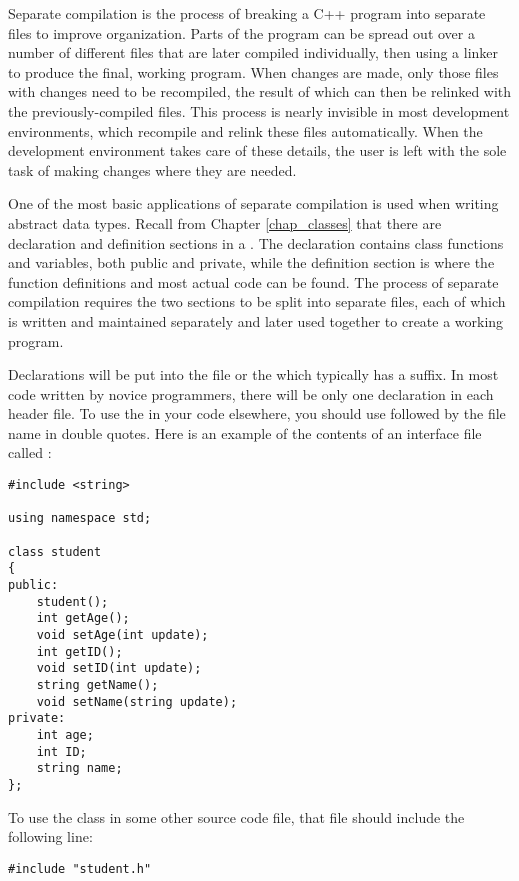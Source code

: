 Separate compilation is the process of breaking a C++ program into separate files to improve organization. 
Parts of the program can be spread out over a number of different files that are later compiled individually, then  using a linker to produce the final, working program. 
When changes are made, only those files with changes need to be recompiled, the result of which can then be relinked with the previously-compiled files. 
This process is nearly invisible in most development environments, which recompile and relink these files automatically.
When the development environment takes care of these details, the user is left with the sole task of making changes where they are needed. 

One of the most basic applications of separate compilation is used when writing abstract data types. 
Recall from Chapter \ref{chap_classes} that there are declaration and definition sections in a . 
The declaration contains class functions and variables, both public and private, while the definition section is where the function definitions and most actual code can be found. 
The process of separate compilation requires the two sections to be split into separate files, each of which is written and maintained separately and later used together to create a working program. 

Declarations will be put into the  file or the  which typically has a  suffix.
In most code written by novice programmers, there will be only one  declaration in each header file. 
To use the  in your code elsewhere, you should use  followed by the file name in double quotes. 
Here is an example of the contents of an interface file called :

\begin{lstlisting}
#include <string>

using namespace std;

class student
{
public:
	student();
	int getAge();
	void setAge(int update);
	int getID();
	void setID(int update);
	string getName();
	void setName(string update);
private:
	int age;
	int ID;
	string name;
};
\end{lstlisting}

To use the  class in some other source code file, that file should include the following line:

\begin{lstlisting}
#include "student.h" 
\end{lstlisting}

